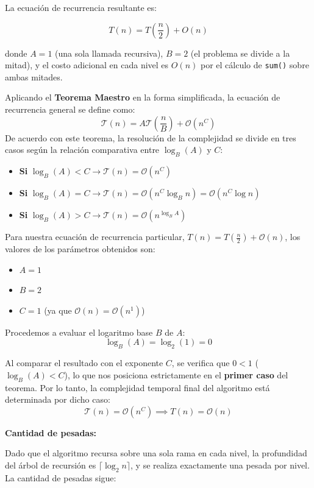 La ecuación de recurrencia resultante es:

\[
T(n) = T\!\left(\frac{n}{2}\right) + O(n)
\]

donde $A = 1$ (una sola llamada recursiva), $B = 2$ (el problema se divide a la mitad), y el costo adicional en cada nivel es $O(n)$ por el cálculo de \texttt{sum()} sobre ambas mitades.

Aplicando el \textbf{Teorema Maestro} en la forma simplificada, la ecuación de recurrencia general se define como:
\[
\mathcal{T}(n) = A\mathcal{T}\left(\frac{n}{B}\right) + \mathcal{O}(n^C)
\]
De acuerdo con este teorema, la resolución de la complejidad se divide en tres casos según la relación comparativa entre $\log_B(A)$ y $C$:
\begin{itemize}
    \item \textbf{Si } $\log_B(A) < C \longrightarrow \mathcal{T}(n) = \mathcal{O}(n^C)$
    \item \textbf{Si } $\log_B(A) = C \longrightarrow \mathcal{T}(n) = \mathcal{O}(n^C \log_B n) = \mathcal{O}(n^C \log n)$
    \item \textbf{Si } $\log_B(A) > C \longrightarrow \mathcal{T}(n) = \mathcal{O}(n^{\log_B A})$
\end{itemize}

Para nuestra ecuación de recurrencia particular, $T(n) = T\left(\frac{n}{2}\right) + \mathcal{O}(n)$, los valores de los parámetros obtenidos son:
\begin{itemize}
    \item $A = 1$
    \item $B = 2$
    \item $C = 1$ \quad (ya que $\mathcal{O}(n) = \mathcal{O}(n^1)$)
\end{itemize}

Procedemos a evaluar el logaritmo base $B$ de $A$:
\[
\log_B(A) = \log_2(1) = 0
\]

Al comparar el resultado con el exponente $C$, se verifica que $0 < 1$ ($\log_B(A) < C$), lo que nos posiciona estrictamente en el \textbf{primer caso} del teorema. Por lo tanto, la complejidad temporal final del algoritmo está determinada por dicho caso:
\[
\mathcal{T}(n) = \mathcal{O}(n^C) \implies \boxed{T(n) = \mathcal{O}(n)}
\]

\textbf{Cantidad de pesadas:}

Dado que el algoritmo recursa sobre una sola rama en cada nivel, la profundidad del árbol de recursión es
$\lceil \log_2 n \rceil$, y se realiza exactamente una pesada por nivel. La cantidad de pesadas sigue:

